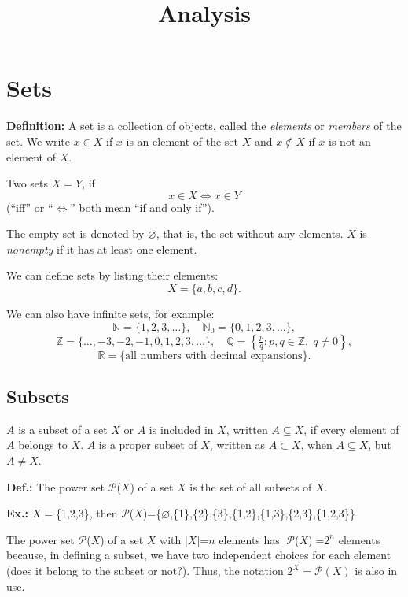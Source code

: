 \documentclass{article}
\begin{document}
\title{Analysis}
\date{}
\maketitle

\newpage
\tableofcontents

\newpage
\section{Sets}

\textbf{Definition:} A set is a collection of objects, called the \emph{elements} or \emph{members} of the set.  
We write $x \in X$ if $x$ is an element of the set $X$ and $x \notin X$ if $x$ is not an element of $X$.

Two sets $X = Y$, if
\[
x \in X \iff x \in Y
\]
(``iff'' or ``$\Leftrightarrow$'' both mean ``if and only if'').

The empty set is denoted by $\varnothing$, that is, the set without any elements.  
$X$ is \emph{nonempty} if it has at least one element.

We can define sets by listing their elements:
\[
X = \{a, b, c, d\}.
\]

We can also have infinite sets, for example:
\[
\mathbb{N} = \{1, 2, 3, \dots\}, \quad
\mathbb{N}_0 = \{0, 1, 2, 3, \dots\},
\]
\[
\mathbb{Z} = \{\dots, -3, -2, -1, 0, 1, 2, 3, \dots\}, \quad
\mathbb{Q} = \left\{ \tfrac{p}{q} : p, q \in \mathbb{Z}, \; q \neq 0 \right\},
\]
\[
\mathbb{R} = \{\text{all numbers with decimal expansions}\}.
\]

\subsection{Subsets}

$A$ is a subset of a set $X$ or $A$ is included in $X$, written $A \subseteq X$, if every element of $A$ belongs to $X$. $A$ is a proper subset of $X$, written as $A \subset X$, when $A \subseteq X$, but $A \neq X$.

\textbf{Def.:} The power set $\mathcal{P}$($X$) of a set $X$ is the set of all subsets of $X$.

\textbf{Ex.:} $X=$\{1,2,3\}, then $\mathcal{P}$($X$)=\{$\varnothing$,\{1\},\{2\},\{3\},\{1,2\},\{1,3\},\{2,3\},\{1,2,3\}\}

The power set $\mathcal{P}$($X$) of a set $X$ with |$X$|=$n$ elements has |$\mathcal{P}$($X$)|=$2^n$ elements because, in defining a subset, we have two independent choices for each element (does it belong to the subset or not?). Thus, the notation $2^X=\mathcal{P}(X)$ is also in use.
\end{document}
